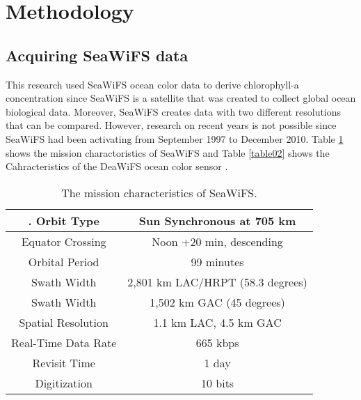\section{Methodology}

\subsection{Acquiring SeaWiFS data}

 This research used SeaWiFS ocean color data to derive chlorophyll-a concentration since SeaWiFS is a satellite that was created to collect global ocean biological data. Moreover, SeaWiFS creates data with two different resolutions that can be compared. However, research on recent years is not possible since SeaWiFS had been activating from September 1997 to December 2010. Table \ref{table01} shows the mission charactoristics of SeaWiFS and Table \ref{table02} shows the Cahracteristics of the DeaWiFS ocean color sensor \cite{hooker1992An}.

 \begin{table}[h]\textwidth
 	\caption{The mission characteristics of SeaWiFS.}
 	\label{table01}
 	\centering
 	\begin{tabular}{c|c}
 		\hline \setlength{\arrayrulewidth}{0.8pt}. 
 	Orbit Type	& Sun Synchronous at 705 km \\ \hline
 	Equator Crossing &	Noon +20 min, descending \\ \hline
 	Orbital Period &	99 minutes  \\ \hline
 	Swath Width &	2,801 km LAC/HRPT (58.3 degrees)  \\ \hline
 	Swath Width &	1,502 km GAC (45 degrees)  \\ \hline
 	Spatial Resolution &	1.1 km LAC, 4.5 km GAC  \\ \hline
 	Real-Time Data Rate &	665 kbps  \\ \hline
 	Revisit Time &	1 day  \\ \hline
 	Digitization &	10 bits  \\ \hline
 	\end{tabular}
 \end{table}

